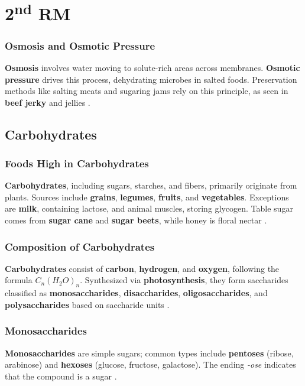 \section{2\texorpdfstring{\textsuperscript{nd}}{nd} RM}
\subsubsection*{Osmosis and Osmotic Pressure}
\textbf{Osmosis} involves water moving to solute-rich areas across membranes. \textbf{Osmotic pressure} drives this process, dehydrating microbes in salted foods. Preservation methods like salting meats and sugaring jams rely on this principle, as seen in \textbf{beef jerky} and jellies \cite*{BKR_02}.

\subsection*{Carbohydrates}
\subsubsection*{Foods High in Carbohydrates}
\textbf{Carbohydrates}, including sugars, starches, and fibers, primarily originate from plants. Sources include \textbf{grains}, \textbf{legumes}, \textbf{fruits}, and \textbf{vegetables}. Exceptions are \textbf{milk}, containing lactose, and animal muscles, storing glycogen. Table sugar comes from \textbf{sugar cane} and \textbf{sugar beets}, while honey is floral nectar \cite*{BKR_02}.

\subsubsection*{Composition of Carbohydrates}
\textbf{Carbohydrates} consist of \textbf{carbon}, \textbf{hydrogen}, and \textbf{oxygen}, following the formula $C_n(H_2O)_n$. Synthesized via \textbf{photosynthesis}, they form saccharides classified as \textbf{monosaccharides}, \textbf{disaccharides}, \textbf{oligosaccharides}, and \textbf{polysaccharides} based on saccharide units \cite*{BKR_02}.

\subsubsection*{Monosaccharides}
\textbf{Monosaccharides} are simple sugars; common types include \textbf{pentoses} (ribose, arabinose) and \textbf{hexoses} (glucose, fructose, galactose). The ending \textit{-ose} indicates that the compound is a sugar \cite*{BKR_02}.

